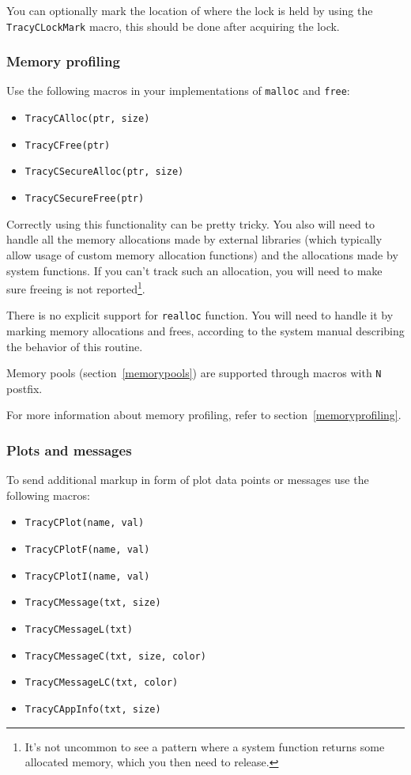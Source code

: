 \documentclass[hidelinks,titlepage,a4paper,twoside]{article}
\begin{document}
You can optionally mark the location of where the lock is held by using the \texttt{TracyCLockMark} macro, this should be done after acquiring the lock.

\subsubsection{Memory profiling}

Use the following macros in your implementations of \texttt{malloc} and \texttt{free}:

\begin{itemize}
\item \texttt{TracyCAlloc(ptr, size)}
\item \texttt{TracyCFree(ptr)}
\item \texttt{TracyCSecureAlloc(ptr, size)}
\item \texttt{TracyCSecureFree(ptr)}
\end{itemize}

Correctly using this functionality can be pretty tricky. You also will need to handle all the memory allocations made by external libraries (which typically allow usage of custom memory allocation functions) and the allocations made by system functions. If you can't track such an allocation, you will need to make sure freeing is not reported\footnote{It's not uncommon to see a pattern where a system function returns some allocated memory, which you then need to release.}.

There is no explicit support for \texttt{realloc} function. You will need to handle it by marking memory allocations and frees, according to the system manual describing the behavior of this routine.

Memory pools (section~\ref{memorypools}) are supported through macros with \texttt{N} postfix.

For more information about memory profiling, refer to section~\ref{memoryprofiling}.

\subsubsection{Plots and messages}

To send additional markup in form of plot data points or messages use the following macros:

\begin{itemize}
\item \texttt{TracyCPlot(name, val)}
\item \texttt{TracyCPlotF(name, val)}
\item \texttt{TracyCPlotI(name, val)}
\item \texttt{TracyCMessage(txt, size)}
\item \texttt{TracyCMessageL(txt)}
\item \texttt{TracyCMessageC(txt, size, color)}
\item \texttt{TracyCMessageLC(txt, color)}
\item \texttt{TracyCAppInfo(txt, size)}
\end{itemize}
\end{document}
